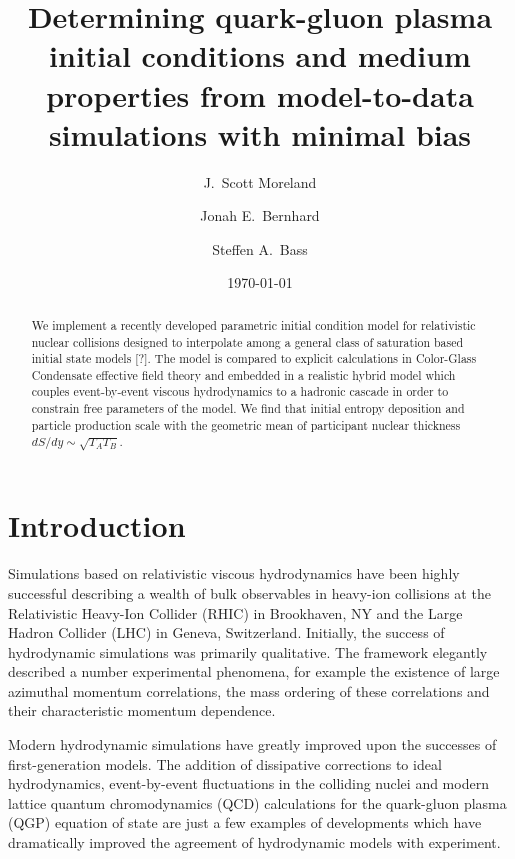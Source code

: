 \documentclass[aps,prc,reprint,amsmath]{revtex4-1}
\begin{document}
\title{Determining quark-gluon plasma initial conditions and medium \\ properties from model-to-data simulations with minimal bias}

\author{J.\ Scott Moreland}
\author{Jonah E.\ Bernhard}
\author{Steffen A.\ Bass}

\date{\today}


\begin{abstract}
    
  We implement a recently developed parametric initial condition model for relativistic nuclear collisions designed to interpolate among a general class of saturation based initial state models [?]. The model is compared to explicit calculations in Color-Glass Condensate effective field theory and embedded in a realistic hybrid model which couples event-by-event viscous hydrodynamics to a hadronic cascade in order to constrain free parameters of the model. We find that initial entropy deposition and particle production scale with the geometric mean of participant nuclear thickness $dS/dy \sim \sqrt{T_A T_B}$. 
\end{abstract}


\maketitle


\section{Introduction}

Simulations based on relativistic viscous hydrodynamics have been highly successful describing a wealth of bulk observables in heavy-ion collisions at the Relativistic Heavy-Ion Collider (RHIC) in Brookhaven, NY and the Large Hadron Collider (LHC) in Geneva, Switzerland. Initially, the success of hydrodynamic simulations was primarily qualitative. The framework elegantly described a number experimental phenomena, for example the existence of large azimuthal momentum correlations, the mass ordering of these correlations and their characteristic momentum dependence.

Modern hydrodynamic simulations have greatly improved upon the successes of first-generation models. The addition of dissipative corrections to ideal hydrodynamics, event-by-event fluctuations in the colliding nuclei and modern lattice quantum chromodynamics (QCD) calculations for the quark-gluon plasma (QGP) equation of state are just a few examples of developments which have dramatically improved the agreement of hydrodynamic models with experiment.
\end{document}
